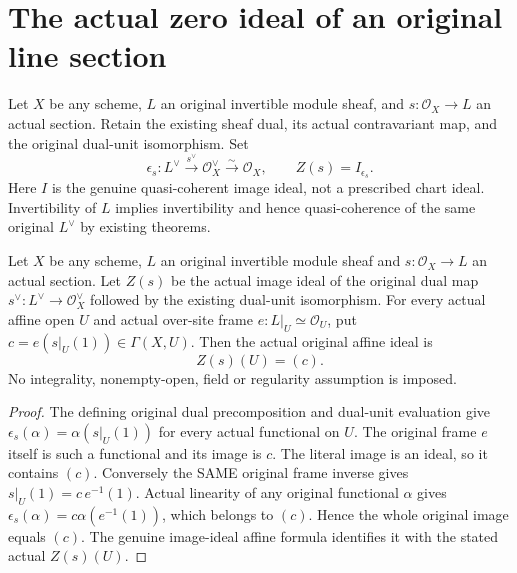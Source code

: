 \section{The actual zero ideal of an original line section}
Let $X$ be any scheme, $L$ an original invertible module sheaf, and
$s:\mathcal O_X\to L$ an actual section. Retain the existing sheaf dual,
its actual contravariant map, and the original dual-unit isomorphism. Set
\[
 \epsilon_s:L^\vee\xrightarrow{s^\vee}\mathcal O_X^\vee
       \xrightarrow{\sim}\mathcal O_X,\qquad
 Z(s)=I_{\epsilon_s}.
\]
Here $I$ is the genuine quasi-coherent image ideal, not a prescribed chart ideal.
Invertibility of $L$ implies invertibility and hence quasi-coherence of the
same original $L^\vee$ by existing theorems.

\begin{lemma}
\label{lem:line-section-zero-ideal-frame}
\leanok
{}
Let $X$ be any scheme, $L$ an original invertible module sheaf and
$s:\mathcal O_X\to L$ an actual section. Let $Z(s)$ be the actual image ideal
of the original dual map $s^\vee:L^\vee\to\mathcal O_X^\vee$ followed
by the existing dual-unit isomorphism. For every actual affine open $U$ and actual over-site frame
$e:L|_U\simeq\mathcal O_U$, put
$c=e(s|_U(1))\in\Gamma(X,U)$. Then the actual original affine ideal is
\[
 Z(s)(U)=(c).
\]
No integrality, nonempty-open, field or regularity assumption is imposed.
\end{lemma}
\begin{proof}
The defining original dual precomposition and dual-unit evaluation give
$\epsilon_s(\alpha)=\alpha(s|_U(1))$ for every actual functional on $U$.
The original frame $e$ itself is such a functional and its image is $c$.
The literal image is an ideal, so it contains $(c)$.
Conversely the SAME original frame inverse gives
$s|_U(1)=c\,e^{-1}(1)$. Actual linearity of any original functional
$\alpha$ gives $\epsilon_s(\alpha)=c\alpha(e^{-1}(1))$, which belongs
to $(c)$. Hence the whole original image equals $(c)$. The genuine
image-ideal affine formula identifies it with the stated actual $Z(s)(U)$.
\end{proof}

